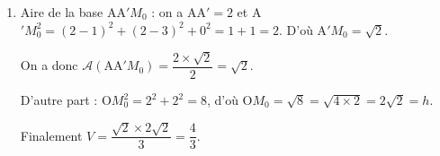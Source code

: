 \begin{enumerate}
Donc le vecteur $\vect{u}$ est orthogonal à deux vecteurs non colinéaires du plan $\left(\text{AA}'M_0\right)$,donc la droite $(d)$ est orthogonale au plan 
$\left(\text{AA}'M_0\right)$. Le point $M_0$ est donc le projeté orthogonal de O sur le plan $\left(\text{AA}'M_0\right)$, donc O$M_0$ est la distance la plus courte du point O au plan $\left(\text{AA}'M_0\right)$.

\item 




Aire de la base AA$'M_0$ : on a AA$' = 2$ et A$'M_0^2 = (2 - 1)^2 + (2 - 3)^2 + 0^2 = 1 + 1 = 2$. D'où A$'M_0 = \sqrt{2}$.

On a donc $\mathcal{A}\left(\text{AA}'M_0\right) = \dfrac{2 \times \sqrt{2}}{2} = \sqrt{2}$.

D'autre part : O$M_0^2 = 2^2 + 2^2 = 8$, d'où O$M_0 = \sqrt{8} = \sqrt{4 \times 2} = 2\sqrt{2} = h$.

Finalement $V  = \dfrac{\sqrt{2} \times 2\sqrt{2}}{3} = \dfrac{4}{3}$.
\end{enumerate}

\vspace{0.75cm}
